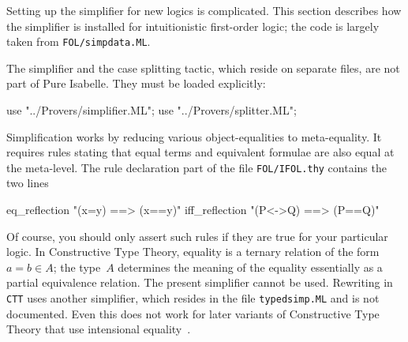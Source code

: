 Setting up the simplifier for new logics is complicated.  This section
describes how the simplifier is installed for intuitionistic first-order
logic; the code is largely taken from {\tt FOL/simpdata.ML}.

The simplifier and the case splitting tactic, which reside on separate
files, are not part of Pure Isabelle.  They must be loaded explicitly:
\begin{ttbox}
use "../Provers/simplifier.ML";
use "../Provers/splitter.ML";
\end{ttbox}

Simplification works by reducing various object-equalities to
meta-equality.  It requires rules stating that equal terms and equivalent
formulae are also equal at the meta-level.  The rule declaration part of
the file {\tt FOL/IFOL.thy} contains the two lines
\begin{ttbox}
eq_reflection   "(x=y)   ==> (x==y)"
iff_reflection  "(P<->Q) ==> (P==Q)"
\end{ttbox}
Of course, you should only assert such rules if they are true for your
particular logic.  In Constructive Type Theory, equality is a ternary
relation of the form $a=b\in A$; the type~$A$ determines the meaning of the
equality essentially as a partial equivalence relation.  The present
simplifier cannot be used.  Rewriting in {\tt CTT} uses another simplifier,
which resides in the file {\tt typedsimp.ML} and is not documented.  Even
this does not work for later variants of Constructive Type Theory that use
intensional equality~\cite{nordstrom90}.


